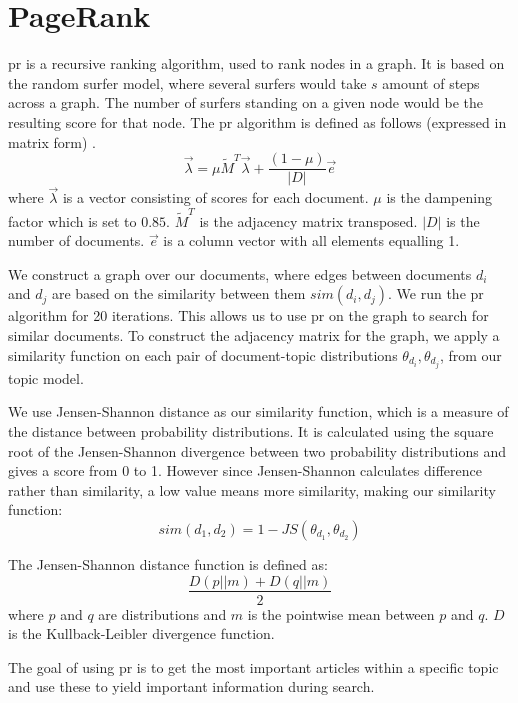 \section{PageRank}\label{sec:pagerank}
\gls{pr} is a recursive ranking algorithm, used to rank nodes in a graph.
It is based on the random surfer model, where several surfers would take $s$ amount of steps across a graph.
The number of surfers standing on a given node would be the resulting score for that node.
The \gls{pr} algorithm is defined as follows (expressed in matrix form) \cite{ClusterPageRank}.
$$ \overrightarrow{\lambda} = \mu \widetilde{M}^T \overrightarrow{\lambda} + \frac{(1-\mu)}{|D|} \overrightarrow{e} $$  
where $\overrightarrow{\lambda}$ is a vector consisting of scores for each document. 
$\mu$ is the dampening factor which is set to $0.85$.
$\widetilde{M}^T$ is the adjacency matrix transposed.
$|D|$ is the number of documents.
$\overrightarrow{e}$ is a column vector with all elements equalling 1.

We construct a graph over our documents, where edges between documents $d_i$ and $d_j$ are based on the similarity between them $sim(d_i, d_j)$.
We run the \gls{pr} algorithm for 20 iterations.
This allows us to use \gls{pr} on the graph to search for similar documents.
To construct the adjacency matrix for the graph, we apply a similarity function on each pair of document-topic distributions $\theta_{d_i}, \theta_{d_j}$, from our topic model.

We use Jensen-Shannon distance as our similarity function, which is a measure of the distance between probability distributions\cite{jensen-shannon2003}\cite{jensen-shannondis2003}.
It is calculated using the square root of the Jensen-Shannon divergence between two probability distributions and gives a score from 0 to 1.
However since Jensen-Shannon calculates difference rather than similarity, a low value means more similarity, making our similarity function:
$$sim(d_1, d_2) = 1 - JS(\theta_{d_1}, \theta_{d_2})$$

The Jensen-Shannon distance function is defined as:
$$ \frac{D(p || m) + D(q || m)}{2}$$
where $p$ and $q$ are distributions and $m$ is the pointwise mean between $p$ and $q$. 
$D$ is the Kullback-Leibler divergence function.

The goal of using \gls{pr} is to get the most important articles within a specific topic and use these to yield important information during search.  
